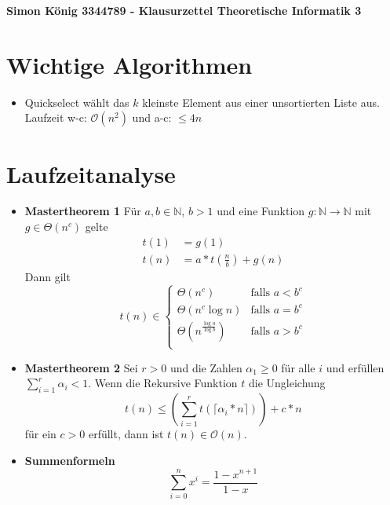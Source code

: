 \documentclass[landscape, 8pt, a4paper]{extarticle}
\newcommand{\N}{\mathbb{N}}
\renewcommand{\O}{\mathcal O}
\begin{document}
\begin{multicols}{3}
	\textbf{Simon König 3344789 - Klausurzettel Theoretische Informatik 3}

	\section{Wichtige Algorithmen}
	\begin{itemize}
		\item Quickselect wählt das $k$ kleinste Element aus einer unsortierten Liste aus. Laufzeit w-c: $\O(n^2)$ und a-c: $\leq4n$
	\end{itemize}

	\section{Laufzeitanalyse}

	\begin{itemize}
		\item \textbf{Mastertheorem 1} Für $a,b\in\N$, $b>1$ und eine Funktion $g:\N\rightarrow \N$ mit $g\in\Theta(n^c)$ gelte
		\begin{align*}
			t(1)&=g(1)\\
			t(n)&=a*t\left(\frac nb\right)+g(n)
		\end{align*}
		Dann gilt 
		\begin{equation*}
			t(n)\in\begin{cases}
			\Theta(n^c)&\text{falls }a<b^c\\
			\Theta(n^c\log n)&\text{falls }a=b^c\\
			\Theta(n^{\frac{\log a}{\log b}})&\text{falls }a>b^c\\
			\end{cases}
		\end{equation*}

		\item \textbf{Mastertheorem 2} Sei $r>0$ und die Zahlen $\alpha_1\geq 0$ für alle $i$ und erfüllen $\sum_{i=1}^r\alpha_i<1$.
		Wenn die Rekursive Funktion $t$ die Ungleichung
		\begin{equation*}
			t(n)\leq \left( \sum_{i=1}^r t(\lceil \alpha_i*n\rceil) \right)+c*n
		\end{equation*}
		für ein $c>0$ erfüllt, dann ist $t(n)\in\O(n)$.

		\item \textbf{Summenformeln}
		\begin{equation*}
			\sum_{i=0}^n x^i = \frac{1-x^{n+1}}{1-x}
		\end{equation*}


\end{itemize}
\end{multicols}
\end{document}
